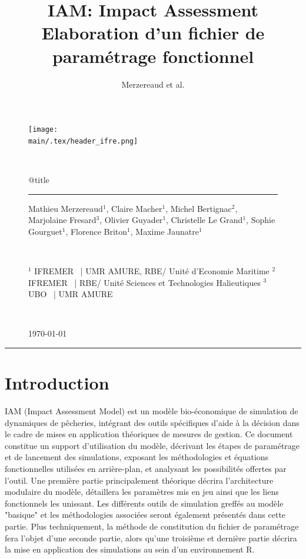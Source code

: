 \documentclass[12pt, colorinlistoftodos]{article}
\title{IAM: Impact Assessment \\ Elaboration d'un fichier de paramétrage fonctionnel}
\author{Merzereaud et al.}
\providecommand{\main}{.}  %
\newenvironment{not used}[1]{%
    \longtable{%
        |>{\centering$\displaystyle}A{#1}{1}<{$}%
        |}\hline\ignorespaces}{%
    \endlongtable\ignorespacesafterend}
\begin{document}
\thispagestyle{plain}

\begin{figure}
    \texttt{[image: \\main/.tex/header\_ifre.png]}
    \par ~ \par
    \begin{minipage}{\textwidth}
        \begin{center}
            {\huge \csname @title\endcsname }
        \end{center}
        \rule{7em}{.4pt}\par
        Mathieu Merzereaud$^1$, Claire Macher$^1$, Michel Bertignac$^2$, Marjolaine Fresard$^3$, Olivier Guyader$^1$, Christelle Le Grand$^1$, Sophie Gourguet$^1$, Florence 
        Briton$^1$, Maxime Jaunatre$^1$ \newline
        \par ~ \par
        $^1$ IFREMER ~| UMR AMURE, RBE/ Unité d'Economie Maritime \newline
        $^2$ IFREMER ~| RBE/ Unité Sciences et Technologies Halieutiques \newline
        $^3$ UBO ~| UMR AMURE
        \par ~ \par
        
        \begin{center}
            {\large \today }
        \end{center}
        
    \end{minipage}
\end{figure}
\hrule

\tableofcontents
{}
\newpage

\section*{Introduction}

IAM (Impact Assessment Model) est un modèle bio-économique de simulation de dynamiques de pêcheries, intégrant des outils spécifiques d'aide à la décision dans le cadre de mises en application théoriques de mesures de gestion. Ce document constitue un support d'utilisation du modèle, décrivant les étapes de paramétrage et de lancement des simulations, exposant les méthodologies et équations fonctionnelles utilisées en arrière-plan, et analysant les possibilités offertes par l'outil. Une première partie  principalement théorique décrira l'architecture modulaire du modèle, détaillera les paramètres mis en jeu ainsi que les liens fonctionnels les unissant. Les différents outils de simulation greffés au modèle "basique" et les méthodologies associées seront également présentés dans cette partie. Plus techniquement, la méthode de constitution du fichier de paramétrage fera l'objet d'une seconde partie, alors qu'une troisième et dernière partie décrira la mise en application des simulations au sein d'un environnement R.
\end{document}
